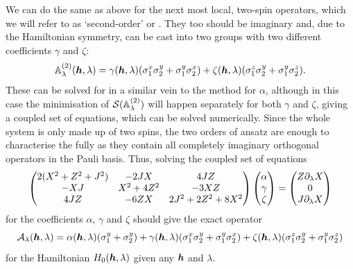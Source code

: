 We can do the same as above for the next most local, two-spin operators, which we will refer to as `second-order' or  . They too should be imaginary and, due to the Hamiltonian symmetry, can be cast into two groups with two different  coefficients $\gamma$ and $\zeta$:
\begin{equation}\label{eq:twospin_so_lcd}
        \mathbb{A}_{\lambda}^{(2)}(\boldsymbol{h}, \lambda) = \gamma(\boldsymbol{h}, \lambda) (\sigma^x_1 \sigma^y_2 + \sigma^y_1 \sigma^x_2) + \zeta(\boldsymbol{h}, \lambda) (\sigma^z_1 \sigma^y_2 + \sigma^y_1 \sigma^z_2).
\end{equation}
These can be solved for in a similar vein to the method for $\alpha$, although in this case the minimisation of $\mathcal{S}(\mathbb{A}_{\lambda}^{(2)})$ will happen separately for both $\gamma$ and $\zeta$, giving a coupled set of equations, which can be solved numerically. Since the whole system is only made up of two spins, the two orders of  ansatz are enough to characterise the  fully as they contain all completely imaginary orthogonal operators in the Pauli basis. Thus, solving the coupled set of equations
\begin{equation}\label{eq:two_spin_coupled_eqs}
        \begin{pmatrix}
        2(X^2 + Z^2 + J^2) & - 2JX & 4JZ \\ 
        -XJ & X^2 + 4Z^2 & -3XZ \\ 
        4JZ & -6ZX & 2J^2 + 2Z^2 + 8X^2
        \end{pmatrix} 
        \begin{pmatrix}
            \alpha \\
            \gamma \\
            \zeta
        \end{pmatrix} = 
        \begin{pmatrix}
            Z \partial_{\lambda} X \\
            0 \\
            J \partial_{\lambda} X
        \end{pmatrix}
\end{equation}
for the coefficients $\alpha$, $\gamma$ and $\zeta$ should give the exact  operator 
\begin{equation}\label{eq:two_spin_exact_AGP}
    \mathcal{A}_{\lambda}(\boldsymbol{h}, \lambda) = \alpha(\boldsymbol{h}, \lambda) (\sigma^y_1 + \sigma^y_2) + \gamma(\boldsymbol{h}, \lambda) (\sigma^x_1 \sigma^y_2 + \sigma^y_1 \sigma^x_2) + \zeta(\boldsymbol{h}, \lambda) (\sigma^z_1 \sigma^y_2 + \sigma^y_1 \sigma^z_2)
\end{equation}
for the Hamiltonian $H_0(\boldsymbol{h}, \lambda)$ given any $\boldsymbol{h}$ and $\lambda$. 

